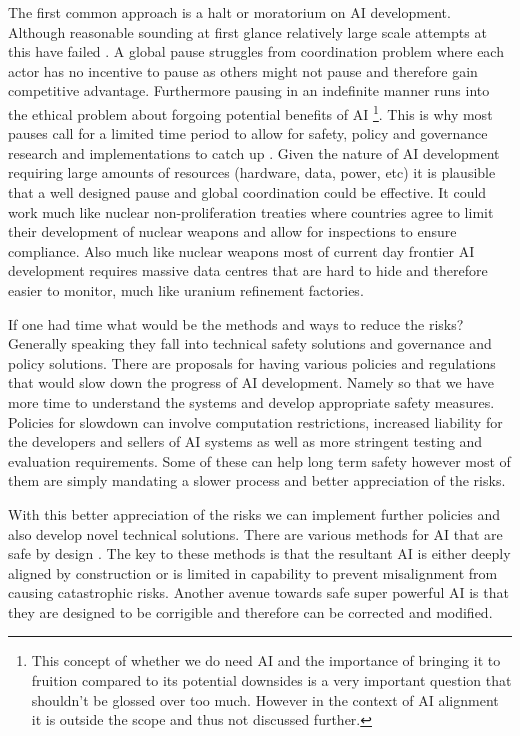 The first common approach is a halt or moratorium on AI development. Although reasonable sounding at first glance relatively large scale attempts at this have failed \cite{PauseGiantAI}. A global pause struggles from coordination problem where each actor has no incentive to pause as others might not pause and therefore gain competitive advantage. Furthermore pausing in an indefinite manner runs into the ethical problem about forgoing potential benefits of AI \footnote{This concept of whether we do need AI and the importance of bringing it to fruition compared to its potential downsides is a very important question that shouldn't be glossed over too much. However in the context of AI alignment it is outside the scope and thus not discussed further.}. This is why most pauses call for a limited time period to allow for safety, policy and governance research and implementations to catch up \cite{PauseAIProposal}. 
Given the nature of AI development requiring large amounts of resources (hardware, data, power, etc) it is plausible that a well designed pause and global coordination could be effective. It could work much like nuclear non-proliferation treaties where countries agree to limit their development of nuclear weapons and allow for inspections to ensure compliance. Also much like nuclear weapons most of current day frontier AI development requires massive data centres that are hard to hide and therefore easier to monitor, much like uranium refinement factories.

If one had time what would be the methods and ways to reduce the risks? Generally speaking they fall into technical safety solutions and governance and policy solutions. There are proposals for having various policies and regulations that would slow down the progress of AI development. Namely so that we have more time to understand the systems and develop appropriate safety measures. Policies for slowdown can involve computation restrictions, increased liability for the developers and sellers of AI systems as well as more stringent testing and evaluation requirements. Some of these can help long term safety however most of them are simply mandating a slower process and better appreciation of the risks.

With this better appreciation of the risks we can implement further policies and also develop novel technical solutions. There are various methods for AI that are safe by design \cite{dalrympleGuaranteedSafeAI2024,bengioSuperintelligentAgentsPose2025a}. The key to these methods is that the resultant AI is either deeply aligned by construction or is limited in capability to prevent misalignment from causing catastrophic risks. Another avenue towards safe super powerful AI is that they are designed to be corrigible \cite{soaresCorrigibility2015} and therefore can be corrected and modified.
